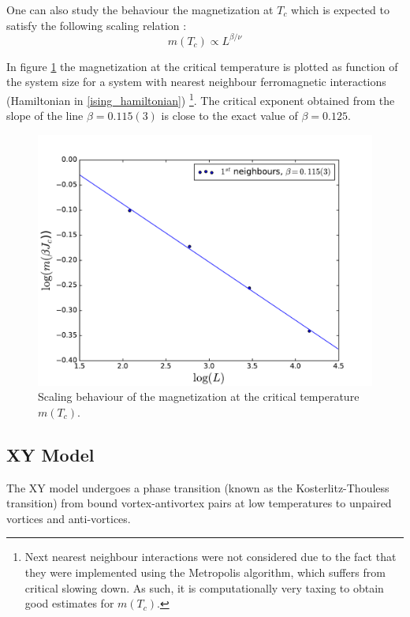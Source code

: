 \documentclass[twoside]{article}
\begin{document}
\begin{multicols}{2}
One can also study the behaviour the magnetization at $T_c$ which is expected to satisfy the following scaling relation \cite{tang}:
\begin{equation}
m(T_c) \propto L^{\beta/\nu}
\end{equation}

In figure \ref{scaling_magnetization} the magnetization at the critical temperature is plotted as function of the system size for a system with nearest neighbour ferromagnetic interactions (Hamiltonian in \eqref{ising_hamiltonian}) \footnote{Next nearest neighbour interactions were not considered due to the fact that they were implemented using the Metropolis algorithm, which suffers from critical slowing down. As such, it is computationally very taxing to obtain good estimates for $m(T_c)$.}. The critical exponent obtained from the slope of the line $\beta = 0.115(3)$ is close to the exact value of $\beta = 0.125$.

\begin{figure}[H]
\centering
\includegraphics[scale=0.4]{images/plot_magnetization.pdf}
\caption{Scaling behaviour of the magnetization at the critical temperature $m(T_c)$.}
\label{scaling_magnetization}
\end{figure}

\subsection{XY Model}
The XY model undergoes a phase transition (known as the Kosterlitz-Thouless transition) from bound vortex-antivortex pairs at low temperatures to unpaired vortices and anti-vortices. 


\end{multicols}
\end{document}
